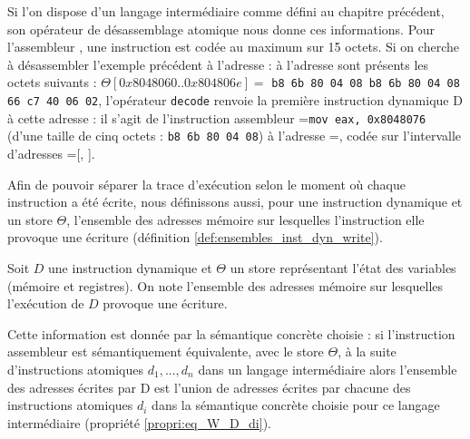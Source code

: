 Si l'on dispose d'un langage intermédiaire comme défini au chapitre précédent, son opérateur de désassemblage atomique nous donne ces informations. Pour l'assembleur \xq, une instruction est codée au maximum sur 15 octets.
Si on cherche à désassembler l'exemple précédent à l'adresse  : à l'adresse  sont présents les octets suivants : $\Theta[0x8048060..0x804806e]=$ \texttt{b8 6b 80 04 08 b8 6b 80 04 08 66 c7 40 06 02}, l'opérateur \texttt{decode} renvoie la première instruction dynamique D à cette adresse : il s'agit de l'instruction assembleur =\texttt{mov eax, 0x8048076} (d'une taille de cinq octets : \texttt{b8 6b 80 04 08}) à l'adresse =, codée sur l'intervalle d'adresses =[, ].

Afin de pouvoir séparer la trace d'exécution selon le moment où chaque instruction a été écrite, nous définissons aussi, pour une instruction dynamique et un store $\Theta$, l'ensemble des adresses mémoire sur lesquelles l'instruction elle provoque une écriture (définition \ref{def:ensembles_inst_dyn_write}).

\begin{defi}
Soit $D$ une instruction dynamique et $\Theta$ un store représentant l'état des variables (mémoire et registres). On note  l'ensemble des adresses mémoire sur lesquelles l'exécution de $D$ provoque une écriture.
\label{def:ensembles_inst_dyn_write}
\end{defi}

Cette information est donnée par la sémantique concrète choisie : si l'instruction assembleur  est sémantiquement équivalente, avec le store $\Theta$, à la suite d'instructions atomiques $d_1, ..., d_n$ dans un langage intermédiaire alors l'ensemble des adresses écrites par D est l'union de adresses écrites par chacune des instructions atomiques $d_i$ dans la sémantique concrète choisie pour ce langage intermédiaire (propriété \ref{propri:eq_W_D_di}).

